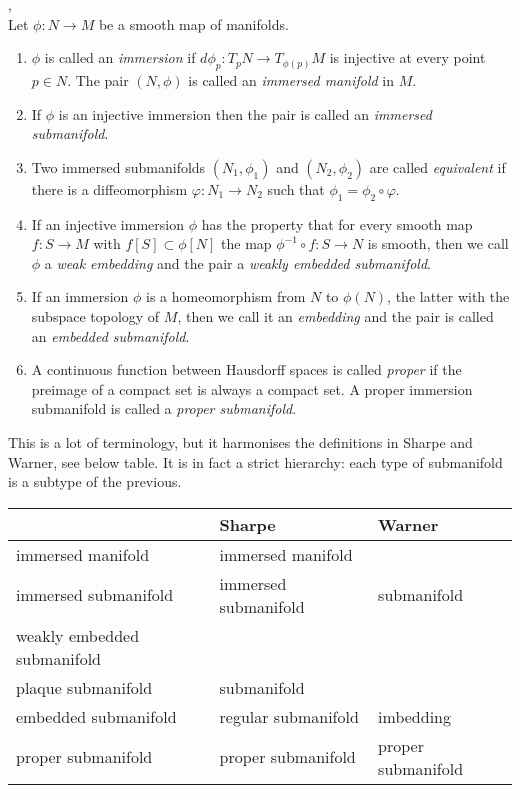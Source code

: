 \begin{definition}\textup{\cite[Def~1.27, Rem~1.33]{Warner1983},\cite[Defs~1.1.36,~1.1.40,~1.2.10,~1.2.21]{Sharpe1997}} \\
Let $\phi : N \to M$ be a smooth map of manifolds.
\begin{enumerate}
\item 
$\phi$ is called an \emph{immersion} if $d\phi_p : T_pN \to T_{\phi(p)}M$ is injective at every point $p \in N$.
The pair $(N,\phi)$ is called an \emph{immersed manifold} in $M$.
\item
If $\phi$ is an injective immersion then the pair is called an \emph{immersed submanifold}.
\item 
Two immersed submanifolds $(N_1,\phi_1)$ and $(N_2,\phi_2)$ are called \emph{equivalent} if there is a diffeomorphism $\varphi : N_1 \to N_2$ such that $\phi_1 = \phi_2 \circ \varphi$.
\item
If an injective immersion $\phi$ has the property that for every smooth map $f: S \to M$ with $f[S] \subset \phi[N]$ the map $\phi^{-1} \circ f : S \to N$ is smooth, then we call $\phi$ a \emph{weak embedding} and the pair a \emph{weakly embedded submanifold}.
\item
If an immersion $\phi$ is a homeomorphism from $N$ to $\phi(N)$, the latter with the subspace topology of $M$, then we call it an \emph{embedding} and the pair is called an \emph{embedded submanifold}.
\item
A continuous function between Hausdorff spaces is called \emph{proper} if the preimage of a compact set is always a compact set.
A proper immersion submanifold is called a \emph{proper submanifold}.
\end{enumerate}
\end{definition}

This is a lot of terminology, but it harmonises the definitions in Sharpe and Warner, see below table.
It is in fact a strict hierarchy: each type of submanifold is a subtype of the previous.

\begin{table}[h]
\begin{tabular}{l|l|l}
 & Sharpe & Warner \\ \hline
immersed manifold & immersed manifold & \\
immersed submanifold & immersed submanifold & submanifold \\
weakly embedded submanifold &  &  \\
plaque submanifold & submanifold &  \\
embedded submanifold & regular submanifold & imbedding \\
proper submanifold & proper submanifold & proper submanifold \\
\end{tabular}
\end{table}

